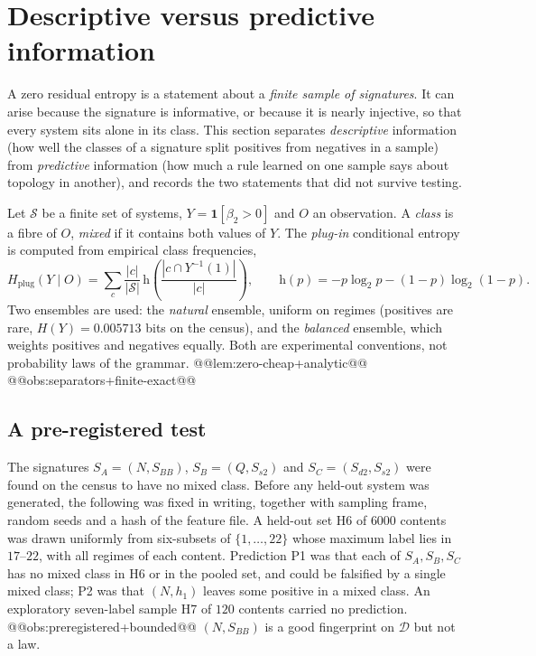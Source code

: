 \section{Descriptive versus predictive information}\label{sec:predictive}
A zero residual entropy is a statement about a \emph{finite sample of signatures}. It can arise because the signature is informative, or because it is nearly injective, so that every system sits alone in its class. This section separates \emph{descriptive} information (how well the classes of a signature split positives from negatives in a sample) from \emph{predictive} information (how much a rule learned on one sample says about topology in another), and records the two statements that did not survive testing.

Let $\mathcal S$ be a finite set of systems, $Y=\mathbf 1[\beta_2>0]$ and $O$ an observation. A \emph{class} is a fibre of $O$, \emph{mixed} if it contains both values of $Y$. The \emph{plug-in} conditional entropy is computed from empirical class frequencies,
\[
H_{\mathrm{plug}}(Y\mid O)=\sum_{c}\frac{|c|}{|\mathcal S|}\,\mathrm h\!\left(\frac{|c\cap Y^{-1}(1)|}{|c|}\right),\qquad \mathrm h(p)=-p\log_2p-(1-p)\log_2(1-p).
\]
Two ensembles are used: the \emph{natural} ensemble, uniform on regimes (positives are rare, $H(Y)=0.005713$ bits on the census), and the \emph{balanced} ensemble, which weights positives and negatives equally. Both are experimental conventions, not probability laws of the grammar.
@@lem:zero-cheap+analytic@@
@@obs:separators+finite-exact@@

\subsection*{A pre-registered test}
The signatures $S_A=(N,S_{BB})$, $S_B=(Q,S_{s2})$ and $S_C=(S_{d2},S_{s2})$ were found on the census to have no mixed class. Before any held-out system was generated, the following was fixed in writing, together with sampling frame, random seeds and a hash of the feature file. A held-out set H6 of $6000$ contents was drawn uniformly from six-subsets of $\{1,\dots,22\}$ whose maximum label lies in $17$--$22$, with all regimes of each content. Prediction P1 was that each of $S_A,S_B,S_C$ has no mixed class in H6 or in the pooled set, and could be falsified by a single mixed class; P2 was that $(N,h_1)$ leaves some positive in a mixed class. An exploratory seven-label sample H7 of $120$ contents carried no prediction.
@@obs:preregistered+bounded@@
$(N,S_{BB})$ is a good fingerprint on $\mathcal D$ but not a law.

